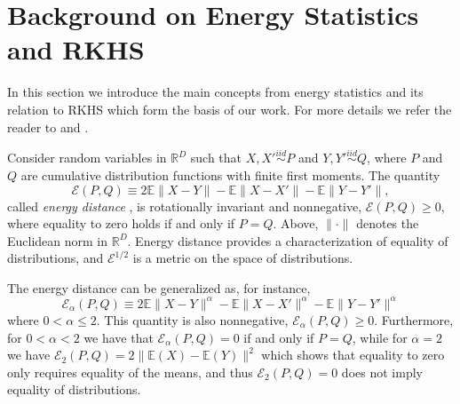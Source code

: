 \documentclass[aps,preprint,nofootinbib,floatfix]{revtex4-1}
\newcommand\Energy{\mathcal{E}}
\newcommand\E{\mathbb{E}}
\begin{document}
\section{Background on Energy Statistics and RKHS}
\label{sec:background}


In this section we introduce the main concepts from energy
statistics and its relation to 
RKHS which form the basis of our work.
For more details we refer the reader
to \cite{Szkely2013} and \cite{Sejdinovic2013}.

Consider random variables in $\mathbb{R}^D$ 
such that $X,X' \stackrel{iid}{\sim} P$ and 
$Y,Y' \stackrel{iid}{\sim} Q$, where $P$ and $Q$ are cumulative
distribution functions with finite first moments. 
The quantity 
\begin{equation}
\label{eq:energy}
\Energy(P, Q) \equiv 2 \E \| X - Y\| - \E \| X - X' \| - \E \| Y - Y' \|,
\end{equation}
called \emph{energy distance} \cite{Szkely2013}, 
is rotationally invariant and nonnegative, $\Energy(P,Q) \ge 0$, where
equality
to zero holds if and only if $P = Q$.
Above, $\| \cdot \|$ denotes the
Euclidean norm in $\mathbb{R}^D$. 
Energy distance
provides a characterization of equality of distributions, and
$\Energy^{1/2}$ is
a metric on the space of distributions.

The energy distance can be generalized as, for instance,
\begin{equation}
\label{eq:energy2}
\Energy_\alpha(P, Q) \equiv 
2 \E \| X - Y\|^{\alpha} - \E \| X - X' \|^{\alpha} - 
\E \| Y - Y' \|^{\alpha}
\end{equation}
where $0<\alpha\le 2$. This quantity is also nonnegative,
$\Energy_\alpha(P,Q) \ge 0$. Furthermore, for $0<\alpha<2$ we have that
$\Energy_\alpha(P,Q) = 0$ if and only if $P=Q$, while for $\alpha=2$ 
we have $\Energy_2(P,Q) = 2\| \E(X) - \E(Y) \|^2$ which shows that
equality to zero only requires
equality of the means, and thus $\Energy_2(P,Q)=0$ does 
not imply equality of distributions.
\end{document}
